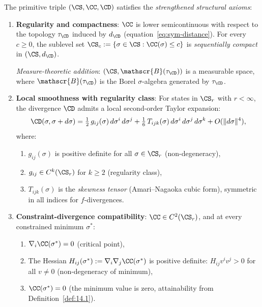 \begin{definition}\label{def:15.1}
The primitive triple $(\CS, \CC, \CD)$ satisfies the
\emph{strengthened structural axioms}:
\begin{enumerate}
  \item[\textbf{SA.1$'$}] \textbf{Regularity and compactness}: $\CC$
        is lower semicontinuous with respect to the topology
        $\tau_{\CD}$ induced by $d_{\CD}$ (equation~\eqref{eq:sym-distance}).
        For every $c \geq 0$, the sublevel set
        $\CS_c := \{\sigma \in \CS : \CC(\sigma) \leq c\}$ is
        \emph{sequentially compact} in $(\CS, d_{\CD})$.

        \emph{Measure-theoretic addition}: $(\CS, \mathscr{B}(\tau_{\CD}))$
        is a measurable space, where $\mathscr{B}(\tau_{\CD})$ is the
        Borel $\sigma$-algebra generated by $\tau_{\CD}$.

  \item[\textbf{SA.2$'$}] \textbf{Local smoothness with regularity class}:
        For states in $\CS_r$ with $r < \infty$, the divergence $\CD$
        admits a local second-order Taylor expansion:
        \[
          \CD(\sigma, \sigma + d\sigma)
          = \tfrac{1}{2}\,g_{ij}(\sigma)\,d\sigma^i\,d\sigma^j
          + \tfrac{1}{6}\,T_{ijk}(\sigma)\,
          d\sigma^i\,d\sigma^j\,d\sigma^k
          + O(\|d\sigma\|^4),
        \]
        where:
        \begin{enumerate}
          \item $g_{ij}(\sigma)$ is positive definite for all
                $\sigma \in \CS_r$ (non-degeneracy),
          \item $g_{ij} \in C^{k}(\CS_r)$ for $k \geq 2$
                (regularity class),
          \item $T_{ijk}(\sigma)$ is the \emph{skewness tensor}
                (Amari--Nagaoka cubic form), symmetric in all indices
                for $f$-divergences.
        \end{enumerate}

  \item[\textbf{SA.3$'$}] \textbf{Constraint-divergence compatibility}:
        $\CC \in C^{2}(\CS_r)$, and at every constrained minimum
        $\sigma^*$:
        \begin{enumerate}
          \item $\nabla_i \CC(\sigma^*) = 0$ (critical point),
          \item The Hessian
                $H_{ij}(\sigma^*) := \nabla_i \nabla_j \CC(\sigma^*)$
                is positive definite: $H_{ij} v^i v^j > 0$ for all
                $v \neq 0$ (non-degeneracy of minimum),
          \item $\CC(\sigma^*) = 0$ (the minimum value is zero,
                attainability from Definition~\ref{def:14.1}).
        \end{enumerate}


\end{enumerate}
\end{definition}
